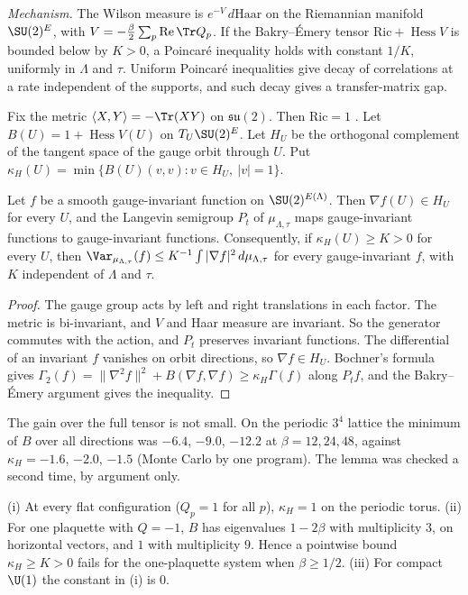 \emph{Mechanism.} The Wilson measure is $e^{-V}\,d\mathrm{Haar}$ on the Riemannian manifold
$\SU(2)^E$, with $V=-\frac{\beta}{2}\sum_p\operatorname{Re}\Tr Q_p$. If the Bakry--\'Emery tensor
$\mathrm{Ric}+\operatorname{Hess}V$ is bounded below by $K>0$, a Poincar\'e inequality holds with
constant $1/K$, uniformly in $\Lambda$ and $\tau$. Uniform Poincar\'e inequalities give decay of
correlations at a rate independent of the supports, and such decay gives a transfer-matrix gap.

Fix the metric $\langle X,Y\rangle=-\Tr(XY)$ on $\mathfrak{su}(2)$. Then $\mathrm{Ric}=1$
\cite{SZZ23}. Let $B(U)=1+\operatorname{Hess}V(U)$ on $T_U\SU(2)^E$. Let $H_U$ be the orthogonal
complement of the tangent space of the gauge orbit through $U$. Put
$\kappa_H(U)=\min\{B(U)(v,v):v\in H_U,\ |v|=1\}$.

\begin{lemma}\label{neg:lem-horizontal}
Let $f$ be a smooth gauge-invariant function on $\SU(2)^{E(\Lambda)}$. Then $\nabla f(U)\in H_U$
for every $U$, and the Langevin semigroup $P_t$ of $\mu_{\Lambda,\tau}$ maps gauge-invariant
functions to gauge-invariant functions. Consequently, if $\kappa_H(U)\ge K>0$ for every $U$,
then $\Var_{\mu_{\Lambda,\tau}}(f)\le K^{-1}\int|\nabla f|^2\,d\mu_{\Lambda,\tau}$ for every
gauge-invariant $f$, with $K$ independent of $\Lambda$ and $\tau$.
\end{lemma}

\begin{proof}
The gauge group acts by left and right translations in each factor. The metric is
bi-invariant, and $V$ and Haar measure are invariant. So the generator commutes with the
action, and $P_t$ preserves invariant functions. The differential of an invariant $f$
vanishes on orbit directions, so $\nabla f\in H_U$. Bochner's formula gives
$\Gamma_2(f)=\|\nabla^2 f\|^2+B(\nabla f,\nabla f)\ge\kappa_H\Gamma(f)$ along $P_tf$, and the
Bakry--\'Emery argument \cite[Thm.~1.4 and (4.7)]{SZZ23} gives the inequality.
\end{proof}

The gain over the full tensor is not small. On the periodic $3^4$ lattice the minimum of $B$
over all directions was $-6.4$, $-9.0$, $-12.2$ at $\beta=12,24,48$, against $\kappa_H=-1.6$,
$-2.0$, $-1.5$ (Monte Carlo by one program). The lemma was checked a second time, by argument
only.

\begin{proposition}\label{neg:prop-flat}
\textup{(i)} At every flat configuration ($Q_p=1$ for all $p$), $\kappa_H=1$ on the periodic torus.
\textup{(ii)} For one plaquette with $Q=-1$, $B$ has eigenvalues $1-2\beta$ with multiplicity $3$,
on horizontal vectors, and $1$ with multiplicity $9$. Hence a pointwise bound
$\kappa_H\ge K>0$ fails for the one-plaquette system when $\beta\ge 1/2$.
\textup{(iii)} For compact $\U(1)$ the constant in \textup{(i)} is $0$.
\end{proposition}

